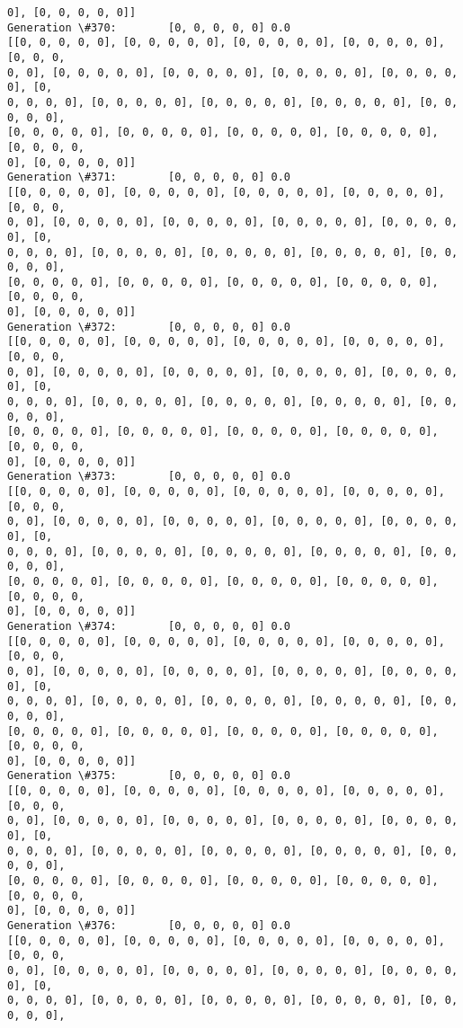 \documentclass[11pt]{article}
\begin{document}
\begin{Verbatim}[commandchars=\\\{\}]
0], [0, 0, 0, 0, 0]]
Generation \#370:        [0, 0, 0, 0, 0] 0.0
[[0, 0, 0, 0, 0], [0, 0, 0, 0, 0], [0, 0, 0, 0, 0], [0, 0, 0, 0, 0], [0, 0, 0,
0, 0], [0, 0, 0, 0, 0], [0, 0, 0, 0, 0], [0, 0, 0, 0, 0], [0, 0, 0, 0, 0], [0,
0, 0, 0, 0], [0, 0, 0, 0, 0], [0, 0, 0, 0, 0], [0, 0, 0, 0, 0], [0, 0, 0, 0, 0],
[0, 0, 0, 0, 0], [0, 0, 0, 0, 0], [0, 0, 0, 0, 0], [0, 0, 0, 0, 0], [0, 0, 0, 0,
0], [0, 0, 0, 0, 0]]
Generation \#371:        [0, 0, 0, 0, 0] 0.0
[[0, 0, 0, 0, 0], [0, 0, 0, 0, 0], [0, 0, 0, 0, 0], [0, 0, 0, 0, 0], [0, 0, 0,
0, 0], [0, 0, 0, 0, 0], [0, 0, 0, 0, 0], [0, 0, 0, 0, 0], [0, 0, 0, 0, 0], [0,
0, 0, 0, 0], [0, 0, 0, 0, 0], [0, 0, 0, 0, 0], [0, 0, 0, 0, 0], [0, 0, 0, 0, 0],
[0, 0, 0, 0, 0], [0, 0, 0, 0, 0], [0, 0, 0, 0, 0], [0, 0, 0, 0, 0], [0, 0, 0, 0,
0], [0, 0, 0, 0, 0]]
Generation \#372:        [0, 0, 0, 0, 0] 0.0
[[0, 0, 0, 0, 0], [0, 0, 0, 0, 0], [0, 0, 0, 0, 0], [0, 0, 0, 0, 0], [0, 0, 0,
0, 0], [0, 0, 0, 0, 0], [0, 0, 0, 0, 0], [0, 0, 0, 0, 0], [0, 0, 0, 0, 0], [0,
0, 0, 0, 0], [0, 0, 0, 0, 0], [0, 0, 0, 0, 0], [0, 0, 0, 0, 0], [0, 0, 0, 0, 0],
[0, 0, 0, 0, 0], [0, 0, 0, 0, 0], [0, 0, 0, 0, 0], [0, 0, 0, 0, 0], [0, 0, 0, 0,
0], [0, 0, 0, 0, 0]]
Generation \#373:        [0, 0, 0, 0, 0] 0.0
[[0, 0, 0, 0, 0], [0, 0, 0, 0, 0], [0, 0, 0, 0, 0], [0, 0, 0, 0, 0], [0, 0, 0,
0, 0], [0, 0, 0, 0, 0], [0, 0, 0, 0, 0], [0, 0, 0, 0, 0], [0, 0, 0, 0, 0], [0,
0, 0, 0, 0], [0, 0, 0, 0, 0], [0, 0, 0, 0, 0], [0, 0, 0, 0, 0], [0, 0, 0, 0, 0],
[0, 0, 0, 0, 0], [0, 0, 0, 0, 0], [0, 0, 0, 0, 0], [0, 0, 0, 0, 0], [0, 0, 0, 0,
0], [0, 0, 0, 0, 0]]
Generation \#374:        [0, 0, 0, 0, 0] 0.0
[[0, 0, 0, 0, 0], [0, 0, 0, 0, 0], [0, 0, 0, 0, 0], [0, 0, 0, 0, 0], [0, 0, 0,
0, 0], [0, 0, 0, 0, 0], [0, 0, 0, 0, 0], [0, 0, 0, 0, 0], [0, 0, 0, 0, 0], [0,
0, 0, 0, 0], [0, 0, 0, 0, 0], [0, 0, 0, 0, 0], [0, 0, 0, 0, 0], [0, 0, 0, 0, 0],
[0, 0, 0, 0, 0], [0, 0, 0, 0, 0], [0, 0, 0, 0, 0], [0, 0, 0, 0, 0], [0, 0, 0, 0,
0], [0, 0, 0, 0, 0]]
Generation \#375:        [0, 0, 0, 0, 0] 0.0
[[0, 0, 0, 0, 0], [0, 0, 0, 0, 0], [0, 0, 0, 0, 0], [0, 0, 0, 0, 0], [0, 0, 0,
0, 0], [0, 0, 0, 0, 0], [0, 0, 0, 0, 0], [0, 0, 0, 0, 0], [0, 0, 0, 0, 0], [0,
0, 0, 0, 0], [0, 0, 0, 0, 0], [0, 0, 0, 0, 0], [0, 0, 0, 0, 0], [0, 0, 0, 0, 0],
[0, 0, 0, 0, 0], [0, 0, 0, 0, 0], [0, 0, 0, 0, 0], [0, 0, 0, 0, 0], [0, 0, 0, 0,
0], [0, 0, 0, 0, 0]]
Generation \#376:        [0, 0, 0, 0, 0] 0.0
[[0, 0, 0, 0, 0], [0, 0, 0, 0, 0], [0, 0, 0, 0, 0], [0, 0, 0, 0, 0], [0, 0, 0,
0, 0], [0, 0, 0, 0, 0], [0, 0, 0, 0, 0], [0, 0, 0, 0, 0], [0, 0, 0, 0, 0], [0,
0, 0, 0, 0], [0, 0, 0, 0, 0], [0, 0, 0, 0, 0], [0, 0, 0, 0, 0], [0, 0, 0, 0, 0],

\end{Verbatim}
\end{document}
